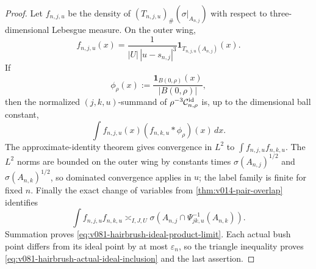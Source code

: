 \documentclass[10pt]{article}
\begin{document}
\begin{proof}
Let \(f_{n,j,u}\) be the density of
\((T_{n,j,u})_\#(\sigma|_{A_{n,j}})\) with respect to three-dimensional Lebesgue measure.  On the
outer wing,
\[
f_{n,j,u}(x)
=
\frac{1}{|U|\,|u-s_{n,j}|^3}
\mathbf 1_{T_{n,j,u}(A_{n,j})}(x).
\]
If
\[
\phi_\rho(x):=\frac{\mathbf 1_{B(0,\rho)}(x)}{|B(0,\rho)|},
\]
then the normalized \((j,k,u)\)-summand of
\(\rho^{-3}\mathcal C^{\rm id}_{n,\rho}\) is, up to the dimensional ball constant,
\[
\int f_{n,j,u}(x)(f_{n,k,u}*\phi_\rho)(x)\,dx.
\]
The approximate-identity theorem gives convergence in \(L^2\) to
\(\int f_{n,j,u}f_{n,k,u}\).  The \(L^2\) norms are bounded on the outer wing by constants times
\(\sigma(A_{n,j})^{1/2}\) and \(\sigma(A_{n,k})^{1/2}\), so dominated convergence applies in
\(u\); the label family is finite for fixed \(n\).  Finally the exact change of variables from
\cref{thm:v014-pair-overlap} identifies
\[
\int f_{n,j,u}f_{n,k,u}
\asymp_{I,J,U}
\sigma\!\left(A_{n,j}\cap\Psi_{jk,u}^{-1}(A_{n,k})\right).
\]
Summation proves \eqref{eq:v081-hairbrush-ideal-product-limit}.  Each actual bush point differs
from its ideal point by at most \(\varepsilon_n\), so the triangle inequality proves
\eqref{eq:v081-hairbrush-actual-ideal-inclusion} and the last assertion.
\end{proof}
\end{document}
